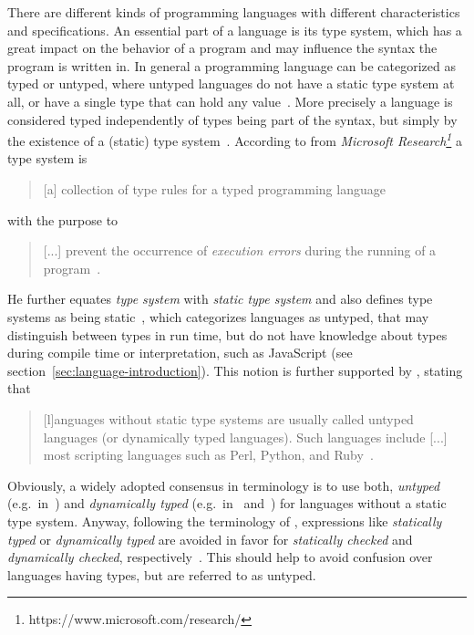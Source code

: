 There are different kinds of programming languages with different characteristics and specifications. An essential part of a language is its type system, which has a great impact on the behavior of a program and may influence the syntax the program is written in.
In general a programming language can be categorized as typed or untyped, where untyped languages do not have a static type system at all, or have a single type that can hold any value~\cite[p.~2]{TypeSystems:Cardelli:2004}. More precisely a language is considered typed independently of types being part of the syntax, but simply by the existence of a (static) type system~\cite[p.~2]{TypeSystems:Cardelli:2004}.
According to \citeauthor{TypeSystems:Cardelli:2004} from \emph{Microsoft Research\footnote{https://www.microsoft.com/research/}} a type system is
\begin{quote}
  [a] collection of type rules for a typed programming language~\cite[p.~38]{TypeSystems:Cardelli:2004}
\end{quote}
with the purpose to
\begin{quote}
  [...] prevent the occurrence of \emph{execution errors} during the running of a program~\cite[p.~1]{TypeSystems:Cardelli:2004}.
\end{quote}
He further equates \emph{type system} with \emph{static type system} and also \citeauthor{TypesAndProgrammingLanguages:Pierce:2002} defines type systems as being static~\cite[p.~2]{TypesAndProgrammingLanguages:Pierce:2002}, which categorizes languages as untyped, that may distinguish between types in run time, but do not have knowledge about types during compile time or interpretation, such as JavaScript (see section~\ref{sec:language-introduction}). This notion is further supported by \citeauthor{ProgrammingLanguagesPrinciplesAndPractices:LoudenLambert:2011}, stating that
\begin{quote}
  [l]anguages without static type systems are usually called untyped languages (or dynamically typed languages). Such languages include [...] most scripting languages such as Perl, Python, and Ruby~\cite[p.~331]{ProgrammingLanguagesPrinciplesAndPractices:LoudenLambert:2011}.
\end{quote}
Obviously, a widely adopted consensus in terminology is to use both, \emph{untyped} (e.g.\ in~\cite[p.~117]{LogicalTypesForUntypedLanguages:Tobin-Hochstadt:2010}) and \emph{dynamically typed} (e.g.\ in~\cite[p.~32]{TowardsAProgramLogicForJavaScript:Gardner:2012} and~\cite[p.~203]{TypeSystemsDirectedProgrammingLanguageEvolution:Nino:2012}) for languages without a static type system. Anyway, following the terminology of \citeauthor{TypeSystems:Cardelli:2004}, expressions like \emph{statically typed} or \emph{dynamically typed} are avoided in favor for \emph{statically checked} and \emph{dynamically checked}, respectively~\cite[p.~1]{TypeSystems:Cardelli:2004}. This should help to avoid confusion over languages having types, but are referred to as untyped.

